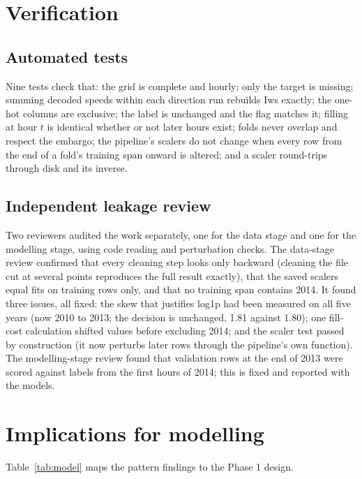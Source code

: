 \documentclass[conference]{IEEEtran}
\begin{document}
\section{Verification}
\label{sec:verify}

\subsection{Automated tests}
Nine tests check that: the grid is complete and hourly; only the target is missing; summing decoded speeds within each direction run rebuilds Iws exactly; the one-hot columns are exclusive; the label is unchanged and the flag matches it; filling at hour $t$ is identical whether or not later hours exist; folds never overlap and respect the embargo; the pipeline's scalers do not change when every row from the end of a fold's training span onward is altered; and a scaler round-trips through disk and its inverse.

\subsection{Independent leakage review}
Two reviewers audited the work separately, one for the data stage and one for the modelling stage, using code reading and perturbation checks. The data-stage review confirmed that every cleaning step looks only backward (cleaning the file cut at several points reproduces the full result exactly), that the saved scalers equal fits on training rows only, and that no training span contains 2014. It found three issues, all fixed: the skew that justifies log1p had been measured on all five years (now 2010 to 2013; the decision is unchanged, 1.81 against 1.80); one fill-cost calculation shifted values before excluding 2014; and the scaler test passed by construction (it now perturbs later rows through the pipeline's own function). The modelling-stage review found that validation rows at the end of 2013 were scored against labels from the first hours of 2014; this is fixed and reported with the models.

\section{Implications for modelling}
Table~\ref{tab:model} maps the pattern findings to the Phase 1 design.
\end{document}
